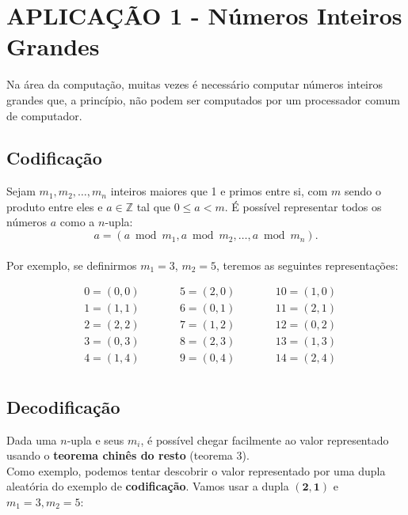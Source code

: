 \section{APLICAÇÃO 1 - Números Inteiros Grandes}
Na área da computação, muitas vezes é necessário computar números inteiros grandes que, a princípio, não podem ser computados por um processador comum de computador.\\

\subsection{Codificação}
Sejam $m_1, m_2, \dots, m_n$ inteiros maiores que 1 e primos entre si, com $m$ sendo o produto entre eles e  $a \in \mathbb{Z}$ tal que $0 \leq a < m$. É possível representar todos os números $a$ como a $n$-upla:
\[
    a = (a \bmod m_1, a \bmod m_2, \dots, a \bmod m_n).
\]
\\
Por exemplo, se definirmos $m_1 = 3$, $m_2 = 5$, teremos as seguintes representações:

\begin{align*}
     & 0 = (0, 0) & \qquad & 5 = (2, 0) & \qquad & 10 = (1, 0) \\
     & 1 = (1, 1) & \qquad & 6 = (0, 1) & \qquad & 11 = (2, 1) \\
     & 2 = (2, 2) & \qquad & 7 = (1, 2) & \qquad & 12 = (0, 2) \\
     & 3 = (0, 3) & \qquad & 8 = (2, 3) & \qquad & 13 = (1, 3) \\
     & 4 = (1, 4) & \qquad & 9 = (0, 4) & \qquad & 14 = (2, 4) \\
\end{align*}

\subsection{Decodificação}
Dada uma $n$-upla e seus $m_i$, é possível chegar facilmente ao valor representado usando o \textbf{teorema chinês do resto} (teorema 3).\\

Como exemplo, podemos tentar descobrir o valor representado por uma dupla aleatória do exemplo de \textbf{codificação}. Vamos usar a dupla $\mathbf{(2,1)}$ e $m_1 = 3, m_2 = 5$:


